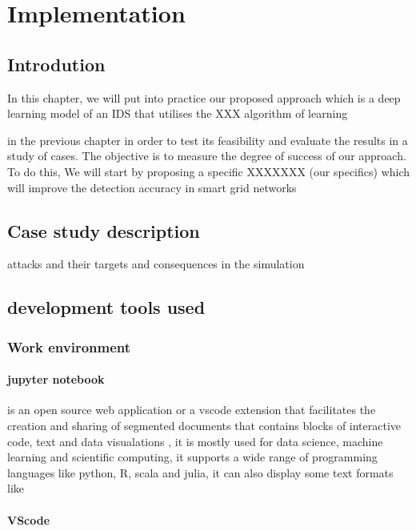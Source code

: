 \chapter{Implementation} \label{chap:Implementation}
\section{Introdution}
In this chapter, we will put into practice our proposed approach which is a deep learning model of an IDS that utilises the XXX algorithm of learning

in the previous chapter in order to test its feasibility and evaluate the results in a study of cases. The objective is to measure the degree of success of our approach. To do this, We will start by proposing a specific 
XXXXXXX (our specifics)
which will improve the detection accuracy in smart grid networks






\section{Case study description}
attacks and their targets and consequences in the simulation



\section{development tools used}
\subsection{Work environment}


\subsubsection{jupyter notebook}
is an open source web application or a vscode extension that facilitates the creation and sharing of segmented documents that contains blocks of interactive code, text and data visualations , it is mostly used for data science, machine learning and scientific computing, it supports a wide range of programming languages like python, R, scala and julia, it can also display some text formats like 


\subsubsection{VScode}



